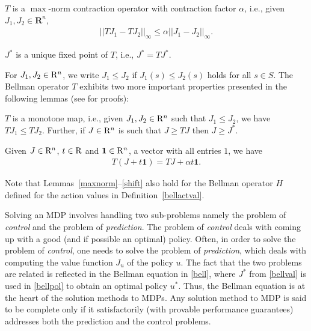 \begin{lemma}\label{maxnorm}
$T$ is a $\max$-norm contraction operator with contraction factor $\alpha$, i.e., given $J_1, J_2 \in \mathbf{R}^n$,
\begin{align}
||TJ_1-TJ_2||_\infty\leq \alpha ||J_1-J_2||_\infty.
\end{align}
\end{lemma}
\begin{lemma}\label{uniquesol} 
$J^*$ is a unique fixed point of $T$, i.e., $J^*=TJ^*$.
\end{lemma}
For $J_1,J_2\in \mathrm{R}^n$, we write $J_1\le J_2$ if $J_1(s)\le J_2(s)$ holds for all $s\in S$.
The Bellman operator $T$ exhibits two more important properties presented in the following lemmas (see \cite{BertB} for proofs):
\begin{lemma}\label{monotone}
$T$ is a monotone map, i.e., given $J_1,J_2 \in \mathrm{R}^n$ such that $J_1\leq J_2$, we have $T J_1\leq T J_2$. 
Further, if $J\in \mathrm{R}^n$ is such that $J\geq TJ$ then $J\geq J^*$.
\end{lemma}
\begin{lemma}\label{shift}
Given $J\in \mathrm{R}^n$, $t \in \mathrm{R}$ and $\mathbf{1} \in \mathrm{R}^n$, a vector with all entries $1$, we have
\begin{align}
T(J+t\mathbf{1})=TJ+\alpha t\mathbf{1}.
\end{align}
\end{lemma}
Note that Lemmas~\ref{maxnorm}--\ref{shift} also hold for the Bellman operator $H$ defined for the action values in Definition~\ref{bellactval}.\par
Solving an MDP involves handling two sub-problems namely the problem of \emph{control} and the problem of \emph{prediction}. The problem of \emph{control} deals with coming up with a good (and if possible an optimal) policy. Often, in order to solve the problem of \emph{control}, one needs to solve the problem of \emph{prediction}, which deals with computing the value function $J_u$ of the policy $u$. The fact that the two problems are related is reflected in the Bellman equation in \eqref{bell}, where $J^*$ from \eqref{bellval} is used in \eqref{bellpol} to obtain an optimal policy $u^*$. Thus, the Bellman equation is at the heart of the solution methods to MDPs. Any solution method to MDP is said to be complete only if it satisfactorily (with provable performance guarantees) addresses both the prediction and the control problems. 

